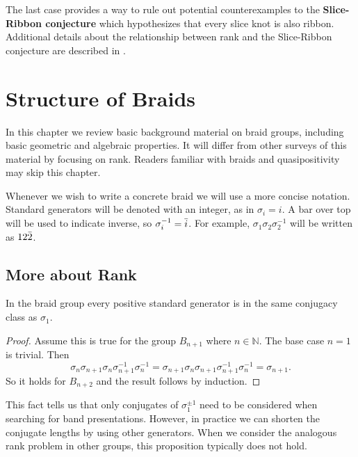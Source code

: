 \documentclass[12pt]{thesis}
\begin{document}
The last case provides a way
to rule out potential counterexamples to the \textbf{Slice-Ribbon conjecture}
which hypothesizes that every slice knot is also ribbon.
Additional details about the relationship between
rank and the Slice-Ribbon conjecture are described in \cite{on-braided-surfaces}.

\chapter{Structure of Braids}

\label{chap:structure}

In this chapter we review basic background material on braid groups,
including basic geometric and algebraic properties.
It will differ from other surveys of this material
by focusing on rank.
Readers familiar with braids and quasipositivity may skip this chapter.

Whenever we wish to write a concrete braid
we will use a more concise notation.
Standard generators will be denoted with an integer, as in $\sigma_{i} = i$.
A bar over top will be used to indicate inverse, so $\sigma_{i}^{-1} = \bar{i}$.
For example, $\sigma_{1}\sigma_{2}\sigma_{2}^{-1}$ will be written as
$12\bar{2}$.

\section{More about Rank}

\begin{proposition} \cite{rudolph-braided-surfaces}
    In the braid group every positive standard
    generator is in the same conjugacy class
    as $\sigma_{1}$.
\end{proposition}

\begin{proof}
    Assume this is true for the group $B_{n+1}$ where $n \in \mathbb{N}$.
    The base case $n = 1$ is trivial.
    Then
    \[
    \sigma_{n}\sigma_{n+1} \sigma_{n} \sigma_{n + 1}^{-1} \sigma_{n}^{-1}
        = \sigma_{n+1} \sigma_{n} \sigma_{n + 1} \sigma_{n + 1}^{-1} \sigma_{n}^{-1}
        = \sigma_{n + 1}.
    \]
    So it holds for $B_{n+2}$ and the result follows by induction.
\end{proof}
This fact tells us that only conjugates of $\sigma_{1}^{\pm 1}$
need to be considered when searching for band presentations.
However, in practice we can shorten the conjugate lengths by using other generators.
When we consider the analogous rank problem in other groups,
this proposition typically does not hold.
\end{document}
